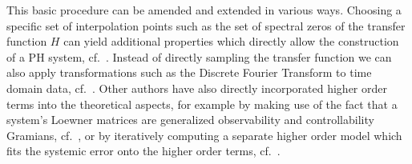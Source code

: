This basic procedure can be amended and extended in various ways.
Choosing a specific set of interpolation points such as the set of spectral zeros of the transfer function $H$ can yield additional properties which directly allow the construction of a \ac{PH} system, cf.~\cite{BGD2020, Poussot2022}.
Instead of directly sampling the transfer function we can also apply transformations such as the Discrete Fourier Transform to time domain data, cf.~\cite{Peherstorfer2017, Cherifi2021}.
Other authors have also directly incorporated higher order terms into the theoretical aspects, for example by making use of the fact that a system's Loewner matrices are generalized observability and controllability Gramians, cf.~\cite{Antoulas2019}, or by iteratively computing a separate higher order model which fits the systemic error onto the higher order terms, cf.~\cite{GKA2021}.




